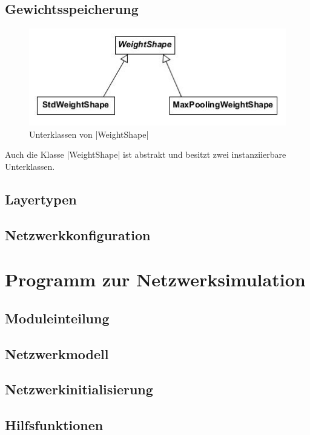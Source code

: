 \documentclass[../main.tex]{subfiles}
\begin{document}
\subsection{Gewichtsspeicherung}
\begin{figure}
	\centering 
	\includegraphics[width=\textwidth]{../images/Schmidt/cd_netdesc_weightshapes.jpg} 
	\caption {Unterklassen von |WeightShape|}
	\label{pic:cd_Netdesc_weightshapes} 
\end{figure} 
Auch die Klasse |WeightShape| ist abstrakt und besitzt zwei instanziierbare Unterklassen. 

\subsection{Layertypen}

\subsection{Netzwerkkonfiguration}



\section{Programm zur Netzwerksimulation}

\subsection{Moduleinteilung}

\subsection{Netzwerkmodell}

\subsection{Netzwerkinitialisierung}

\subsection{Hilfsfunktionen}
\end{document}
